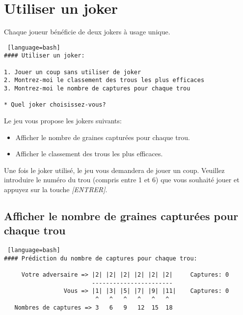 \documentclass[11pt,a4paper]{report}
\begin{document}
        \newpage

        \section{Utiliser un joker}

            \begin{flushleft}
                Chaque joueur bénéficie de deux jokers à usage unique.
            \end{flushleft}

\begin{lstlisting} [language=bash]
#### Utiliser un joker:

1. Jouer un coup sans utiliser de joker
2. Montrez-moi le classement des trous les plus efficaces
3. Montrez-moi le nombre de captures pour chaque trou

* Quel joker choisissez-vous?
\end{lstlisting}

            \begin{flushleft}
                Le jeu vous propose les jokers suivants:
            \end{flushleft}

            \begin{flushleft}
                \begin{itemize}\renewcommand{\labelitemi}{$\bullet$}
                    \item Afficher le nombre de graines capturées pour chaque trou.
                    \item Afficher le classement des trous les plus efficaces.
                \end{itemize}
            \end{flushleft}

            \begin{flushleft}
                Une fois le joker utilisé, le jeu vous demandera de jouer un coup. Veuillez introduire le numéro du trou (compris entre 1 et 6) que vous souhaité jouer et appuyez sur la touche \textit{[ENTRER]}.
            \end{flushleft}

            \subsection{Afficher le nombre de graines capturées pour chaque trou}

\begin{lstlisting} [language=bash]
#### Prédiction du nombre de captures pour chaque trou:

     Votre adversaire => |2| |2| |2| |2| |2| |2|     Captures: 0
                         -----------------------
                 Vous => |1| |3| |5| |7| |9| |11|    Captures: 0
                          ^   ^   ^   ^   ^   ^
   Nombres de captures => 3   6   9   12  15  18   
\end{lstlisting}
\end{document}

